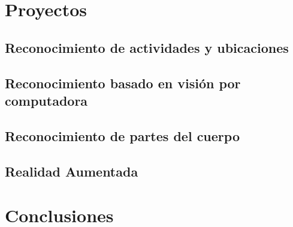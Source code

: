 \documentclass[aspectratio=169]{beamer}
\begin{document}
\section{Proyectos}

\subsection{Reconocimiento de actividades y ubicaciones}





\subsection{Reconocimiento basado en visión por computadora}








\subsection{Reconocimiento de partes del cuerpo}





\subsection{Realidad Aumentada}








\section{Conclusiones}
\end{document}
